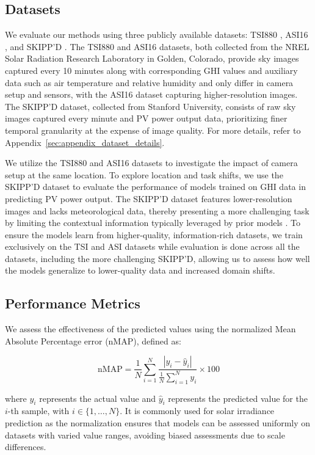 \subsection{Datasets}
We evaluate our methods using three publicly available datasets: TSI880 \cite{tsi_dataset}, ASI16 \cite{tsi_dataset}, and SKIPP'D \cite{skippd_dataset}. The TSI880 and ASI16 datasets, both collected from the NREL Solar Radiation Research Laboratory in Golden, Colorado, provide sky images captured every 10 minutes along with corresponding GHI values and auxiliary data such as air temperature and relative humidity and only differ in camera setup and sensors, with the ASI16 dataset capturing higher-resolution images. The SKIPP'D dataset, collected from Stanford University, consists of raw sky images captured every minute and PV power output data, prioritizing finer temporal granularity at the expense of image quality. For more details, refer to Appendix~\ref{sec:appendix_dataset_details}.

We utilize the TSI880 and ASI16 datasets to investigate the impact of camera setup at the same location. To explore location and task shifts, we use the SKIPP'D dataset to evaluate the performance of models trained on GHI data in predicting PV power output. The SKIPP'D dataset features lower-resolution images and lacks meteorological data, thereby presenting a more challenging task by limiting the contextual information typically leveraged by prior models \cite{wacv2022, talha2019}. To ensure the models learn from higher-quality, information-rich datasets, we train exclusively on the TSI and ASI datasets while evaluation is done across all the datasets, including the more challenging SKIPP'D, allowing us to assess how well the models generalize to lower-quality data and increased domain shifts.


\subsection{Performance Metrics}
We assess the effectiveness of the predicted values using the normalized Mean Absolute Percentage error (nMAP), defined as:

\begin{equation}
\text{nMAP} = \frac{1}{N} \sum_{i=1}^{N} \frac{|y_i - \hat{y}_i|}{\frac{1}{N} \sum_{i=1}^{N} y_i} \times 100 
\end{equation}

where \( y_i \) represents the actual value and \( \hat{y}_i \) represents the predicted value for the \( i \)-th sample, with \( i \in \{1, \dots, N\} \). It is commonly used for solar irradiance prediction as the normalization ensures that models can be assessed uniformly on datasets with varied value ranges, avoiding biased assessments due to scale differences.


